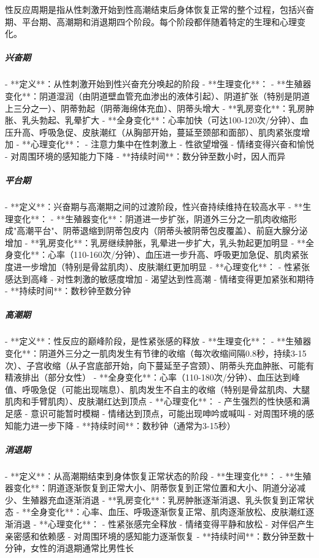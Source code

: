 \begin{enumerate}
性反应周期是指从性刺激开始到性高潮结束后身体恢复正常的整个过程，包括兴奋期、平台期、高潮期和消退期四个阶段。每个阶段都伴随着特定的生理和心理变化。

\subparagraph{兴奋期}

- **定义**：从性刺激开始到性兴奋充分唤起的阶段
- **生理变化**：
  - **生殖器变化**：阴道湿润（由阴道壁血管充血渗出的液体引起）、阴道扩张（特别是阴道上三分之一）、阴蒂勃起（阴蒂海绵体充血）、阴蒂头增大
  - **乳房变化**：乳房肿胀、乳头勃起、乳晕扩大
  - **全身变化**：心率加快（可达100-120次/分钟）、血压升高、呼吸急促、皮肤潮红（从胸部开始，蔓延至颈部和面部）、肌肉紧张度增加
- **心理变化**：
  - 注意力集中在性刺激上
  - 性欲望增强
  - 情绪变得兴奋和愉悦
  - 对周围环境的感知能力下降
- **持续时间**：数分钟至数小时，因人而异

\subparagraph{平台期}

- **定义**：兴奋期与高潮期之间的过渡阶段，性兴奋持续维持在较高水平
- **生理变化**：
  - **生殖器变化**：阴道进一步扩张，阴道外三分之一肌肉收缩形成"高潮平台"、阴蒂退缩到阴蒂包皮内（阴蒂头被阴蒂包皮覆盖）、前庭大腺分泌增加
  - **乳房变化**：乳房继续肿胀，乳晕进一步扩大，乳头勃起更加明显
  - **全身变化**：心率（110-160次/分钟）、血压进一步升高、呼吸更加急促、肌肉紧张度进一步增加（特别是骨盆肌肉）、皮肤潮红更加明显
- **心理变化**：
  - 性紧张感达到高峰
  - 对性刺激的敏感度增加
  - 渴望达到性高潮
  - 情绪变得更加紧张和期待
- **持续时间**：数秒钟至数分钟

\subparagraph{高潮期}

- **定义**：性反应的巅峰阶段，是性紧张感的释放
- **生理变化**：
  - **生殖器变化**：阴道外三分之一肌肉发生有节律的收缩（每次收缩间隔0.8秒，持续3-15次）、子宫收缩（从子宫底部开始，向下蔓延至子宫颈）、阴蒂头充血肿胀、可能有精液排出（部分女性）
  - **全身变化**：心率（110-180次/分钟）、血压达到峰值、呼吸急促（可能出现喘息）、肌肉发生不自主的收缩（特别是骨盆肌肉、大腿肌肉和手臂肌肉）、皮肤潮红达到顶点
- **心理变化**：
  - 产生强烈的性快感和满足感
  - 意识可能暂时模糊
  - 情绪达到顶点，可能出现呻吟或喊叫
  - 对周围环境的感知能力进一步下降
- **持续时间**：数秒钟（通常为3-15秒）

\subparagraph{消退期}

- **定义**：从高潮期结束到身体恢复正常状态的阶段
- **生理变化**：
  - **生殖器变化**：阴道逐渐恢复到正常大小、阴蒂恢复到正常位置和大小、阴道分泌减少、生殖器充血逐渐消退
  - **乳房变化**：乳房肿胀逐渐消退、乳头恢复到正常状态
  - **全身变化**：心率、血压、呼吸逐渐恢复正常、肌肉逐渐放松、皮肤潮红逐渐消退
- **心理变化**：
  - 性紧张感完全释放
  - 情绪变得平静和放松
  - 对伴侣产生亲密感和依赖感
  - 对周围环境的感知能力逐渐恢复
- **持续时间**：数分钟至数十分钟，女性的消退期通常比男性长


\end{enumerate}
